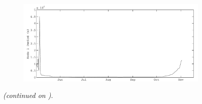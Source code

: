\begin{figure}[!htb]
\begin{subfigure}{\lafigsize}
    \includegraphics[width = \linewidth]{figures/Sparkling_ST1.pdf}
  \end{subfigure}
  \caption[\lafigdesc.]{\label{fig:la:outputs:1}\lafigdesc{} \emph{(continued on )}.}
\end{figure}
